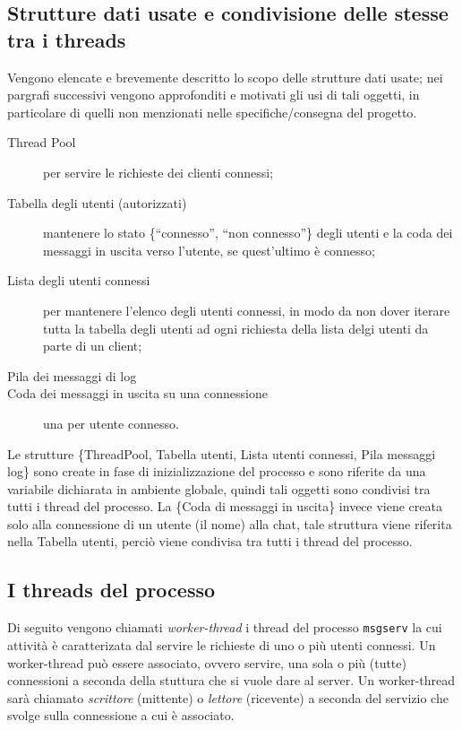 \documentclass[a4paper,10pt]{article}
\begin{document}
\subsection{Strutture dati usate e condivisione delle stesse tra i threads}
Vengono elencate e brevemente descritto lo scopo delle strutture dati
usate; nei pargrafi successivi vengono approfonditi e motivati gli usi
di tali oggetti, in particolare di quelli non menzionati nelle
specifiche/consegna del progetto.
\begin{description}
  \item [Thread Pool] per servire le richieste dei clienti connessi;
  \item [Tabella degli utenti (autorizzati)] mantenere lo
    stato \{``connesso'', ``non connesso''\} degli
    utenti e la coda dei messaggi in uscita verso l'utente, se
    quest'ultimo \`e connesso;
  \item [Lista degli utenti connessi] per mantenere l'elenco degli
    utenti connessi, in modo da non dover iterare tutta la tabella
    degli utenti ad ogni richiesta della lista delgi utenti da parte
    di un client;
  \item [Pila dei messaggi di log]
  \item [Coda dei messaggi in uscita su una connessione] una per
    utente connesso.
\end{description}
Le strutture \{ThreadPool, Tabella utenti, Lista utenti connessi, Pila
messaggi log\} sono create in fase di inizializzazione del processo e
sono riferite da una variabile dichiarata in ambiente globale, quindi
tali oggetti sono condivisi tra tutti i thread del processo. La \{Coda
di messaggi in uscita\} invece viene creata solo alla connessione di
un utente (il nome) alla chat, tale struttura viene riferita nella
Tabella utenti, perci\`o viene condivisa tra tutti i thread del
processo.

\subsection{I threads del processo}
Di seguito vengono chiamati \emph{worker-thread} i thread del processo
\texttt{msgserv} la cui attivit\`a \`e caratterizata dal servire le
richieste di uno o pi\`u utenti connessi. Un worker-thread pu\`o
essere associato, ovvero servire, una sola o pi\`u (tutte) connessioni
a seconda della stuttura che si vuole dare al server. Un worker-thread
sar\`a chiamato \emph{scrittore} (mittente) o \emph{lettore}
(ricevente) a seconda del servizio che svolge sulla connessione a cui
\`e associato.
\end{document}

